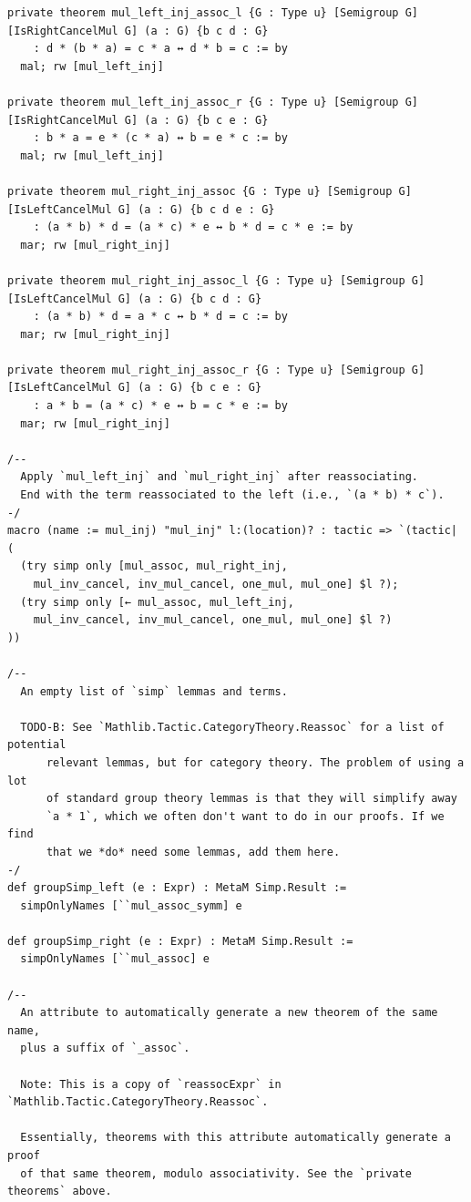 \begin{Verbatim}
private theorem mul_left_inj_assoc_l {G : Type u} [Semigroup G] [IsRightCancelMul G] (a : G) {b c d : G}
    : d * (b * a) = c * a ↔ d * b = c := by
  mal; rw [mul_left_inj]

private theorem mul_left_inj_assoc_r {G : Type u} [Semigroup G] [IsRightCancelMul G] (a : G) {b c e : G}
    : b * a = e * (c * a) ↔ b = e * c := by
  mal; rw [mul_left_inj]

private theorem mul_right_inj_assoc {G : Type u} [Semigroup G] [IsLeftCancelMul G] (a : G) {b c d e : G}
    : (a * b) * d = (a * c) * e ↔ b * d = c * e := by
  mar; rw [mul_right_inj]

private theorem mul_right_inj_assoc_l {G : Type u} [Semigroup G] [IsLeftCancelMul G] (a : G) {b c d : G}
    : (a * b) * d = a * c ↔ b * d = c := by
  mar; rw [mul_right_inj]

private theorem mul_right_inj_assoc_r {G : Type u} [Semigroup G] [IsLeftCancelMul G] (a : G) {b c e : G}
    : a * b = (a * c) * e ↔ b = c * e := by
  mar; rw [mul_right_inj]

/--
  Apply `mul_left_inj` and `mul_right_inj` after reassociating.
  End with the term reassociated to the left (i.e., `(a * b) * c`).
-/
macro (name := mul_inj) "mul_inj" l:(location)? : tactic => `(tactic| (
  (try simp only [mul_assoc, mul_right_inj,
    mul_inv_cancel, inv_mul_cancel, one_mul, mul_one] $l ?);
  (try simp only [← mul_assoc, mul_left_inj,
    mul_inv_cancel, inv_mul_cancel, one_mul, mul_one] $l ?)
))

/--
  An empty list of `simp` lemmas and terms.

  TODO-B: See `Mathlib.Tactic.CategoryTheory.Reassoc` for a list of potential
      relevant lemmas, but for category theory. The problem of using a lot
      of standard group theory lemmas is that they will simplify away
      `a * 1`, which we often don't want to do in our proofs. If we find
      that we *do* need some lemmas, add them here.
-/
def groupSimp_left (e : Expr) : MetaM Simp.Result :=
  simpOnlyNames [``mul_assoc_symm] e

def groupSimp_right (e : Expr) : MetaM Simp.Result :=
  simpOnlyNames [``mul_assoc] e

/--
  An attribute to automatically generate a new theorem of the same name,
  plus a suffix of `_assoc`.

  Note: This is a copy of `reassocExpr` in `Mathlib.Tactic.CategoryTheory.Reassoc`.

  Essentially, theorems with this attribute automatically generate a proof
  of that same theorem, modulo associativity. See the `private theorems` above.


\end{Verbatim}
